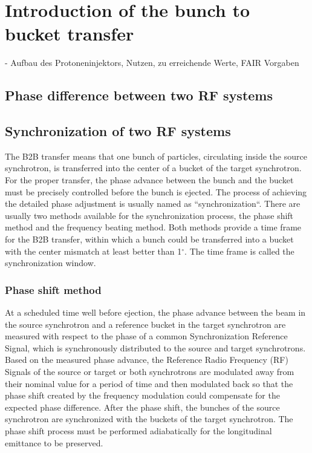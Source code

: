 \section{Introduction of the bunch to bucket transfer}
- Aufbau des Protoneninjektors, Nutzen, zu erreichende Werte, FAIR Vorgaben
\subsection{Phase difference between two RF systems}

\subsection{Synchronization of two RF systems}
The B2B transfer means that one bunch of particles, circulating inside the source synchrotron, is transferred into the center of a bucket of the target synchrotron. For the proper transfer, the phase advance between the bunch and the bucket must be precisely controlled before the bunch is ejected. The process of achieving the detailed phase adjustment is usually named  as ``synchronization``. 
There are usually two methods available for the synchronization process, the phase shift method and the frequency beating method. Both methods provide a time frame for the B2B transfer, within which a bunch could be transferred into a bucket with the center mismatch at least better than 1$^\circ$. The time frame is called the synchronization window. 

\subsubsection{Phase shift method}

At a scheduled time well before ejection, the phase advance between the beam in the source synchrotron and a reference bucket in the target synchrotron are measured with respect to the phase of a common Synchronization Reference Signal, which is synchronously distributed to the source and target synchrotrons. Based on the measured phase advance, the  Reference Radio Frequency (RF) Signals of the source or target or both synchrotrons are modulated away from their nominal value for a period of time and then modulated back so that the phase shift created by the frequency modulation could compensate for the expected phase difference. After the phase shift, the bunches of the source synchrotron are synchronized with the buckets of the target synchrotron. The phase shift process must be performed adiabatically for the longitudinal emittance to be preserved.

